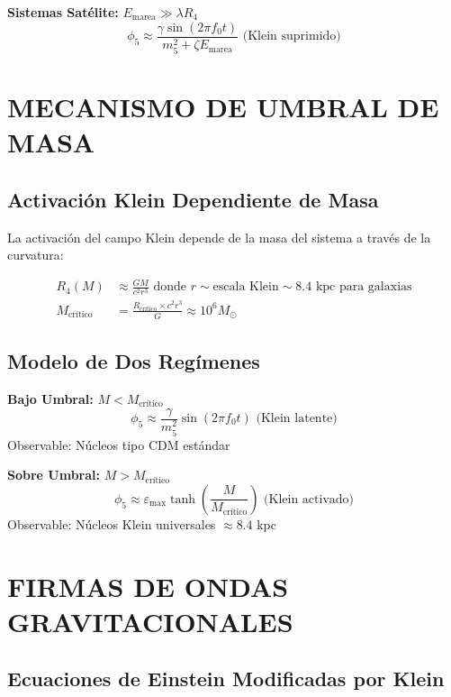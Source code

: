 \documentclass[12pt,a4paper]{article}
\begin{document}
\textbf{Sistemas Satélite:} $E_{\text{marea}} \gg \lambda R_4$
\begin{equation}
\phi_5 \approx \frac{\gamma \sin(2\pi f_0 t)}{m_5^2 + \zeta E_{\text{marea}}} \text{ (Klein suprimido)}
\end{equation}

\section{MECANISMO DE UMBRAL DE MASA}

\subsection{Activación Klein Dependiente de Masa}

La activación del campo Klein depende de la masa del sistema a través de la curvatura:

\begin{align}
R_4(M) &\approx \frac{GM}{c^2r^3} \text{ donde } r \sim \text{escala Klein} \sim 8.4 \text{ kpc para galaxias}\\
M_{\text{crítico}} &= \frac{R_{\text{crítico}} \times c^2r^3}{G} \approx 10^6 M_\odot
\end{align}

\subsection{Modelo de Dos Regímenes}

\textbf{Bajo Umbral:} $M < M_{\text{crítico}}$
\begin{equation}
\phi_5 \approx \frac{\gamma}{m_5^2} \sin(2\pi f_0 t) \text{ (Klein latente)}
\end{equation}
Observable: Núcleos tipo CDM estándar

\textbf{Sobre Umbral:} $M > M_{\text{crítico}}$
\begin{equation}
\phi_5 \approx \varepsilon_{\max} \tanh\left(\frac{M}{M_{\text{crítico}}}\right) \text{ (Klein activado)}
\end{equation}
Observable: Núcleos Klein universales $\approx 8.4$ kpc

\section{FIRMAS DE ONDAS GRAVITACIONALES}

\subsection{Ecuaciones de Einstein Modificadas por Klein}
\end{document}
